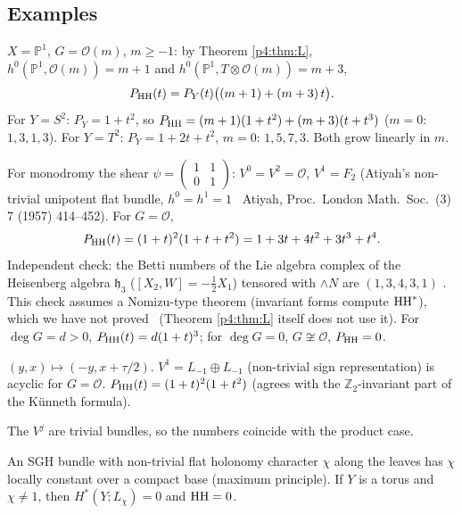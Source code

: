 \subsection{Examples}\label{p4:sec:examples}
\begin{ex}\tP\tV
$X=\mathbb P^1$, $G=\mathcal O(m)$, $m\ge-1$: by Theorem \ref{p4:thm:L}, $h^0(\mathbb P^1,\mathcal O(m))=m+1$ and $h^0(\mathbb P^1,T\otimes\mathcal O(m))=m+3$,
\[P_{\mathrm{HH}}(t)=P_Y(t)\bigl((m+1)+(m+3)\,t\bigr).\]
For $Y=S^2$: $P_Y=1+t^2$, so $P_{\mathrm{HH}}=(m+1)(1+t^2)+(m+3)(t+t^3)$ ($m=0$: $1,3,1,3$). For $Y=T^2$: $P_Y=1+2t+t^2$, $m=0$: $1,5,7,3$. Both grow linearly in $m$.
\end{ex}
\begin{ex}\tP\tV\tQ
For monodromy the shear $\psi=\begin{pmatrix}1&1\\0&1\end{pmatrix}$: $V^0=V^2=\mathcal O$, $V^1=F_2$ (Atiyah's non-trivial unipotent flat bundle, $h^0=h^1=1$ \tC\ Atiyah, Proc.\ London Math.\ Soc.\ (3) 7 (1957) 414--452). For $G=\mathcal O$,
\[P_{\mathrm{HH}}(t)=(1+t)^2(1+t+t^2)=1+3t+4t^2+3t^3+t^4.\]
Independent check: the Betti numbers of the Lie algebra complex of the Heisenberg algebra $\mathfrak h_3$ ($[X_2,W]=-\tfrac12X_1$) tensored with $\wedge N$ are $(1,3,4,3,1)$ \tV. This check assumes a Nomizu-type theorem (invariant forms compute $\mathrm{HH}^*$), which we have not proved \tQ\ (Theorem \ref{p4:thm:L} itself does not use it). For $\deg G=d>0$, $P_{\mathrm{HH}}(t)=d(1+t)^3$; for $\deg G=0$, $G\not\cong\mathcal O$, $P_{\mathrm{HH}}=0$.
\end{ex}
\begin{ex}\tP\tV
$(y,x)\mapsto(-y,x+\tau/2)$. $V^1=L_{-1}\oplus L_{-1}$ (non-trivial sign representation) is acyclic for $G=\mathcal O$. $P_{\mathrm{HH}}(t)=(1+t)^2(1+t^2)$ (agrees with the $\mathbb Z_2$-invariant part of the Künneth formula).
\end{ex}
\begin{ex}\tP
The $V^j$ are trivial bundles, so the numbers coincide with the product case.
\end{ex}
\begin{rem}
An SGH bundle with non-trivial flat holonomy character $\chi$ along the leaves has $\chi$ locally constant over a compact base (maximum principle). If $Y$ is a torus and $\chi\neq1$, then $H^*(Y;L_\chi)=0$ and $\mathrm{HH}=0$. \tP
\end{rem}

